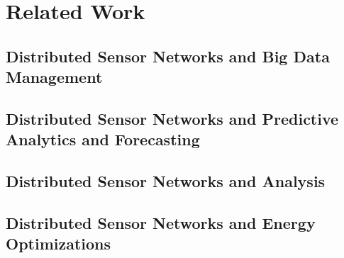 \chapter{Related Work}

\section{Distributed Sensor Networks and Big Data Management}

\section{Distributed Sensor Networks and Predictive Analytics and Forecasting}

\section{Distributed Sensor Networks and Analysis}

\section{Distributed Sensor Networks and Energy Optimizations}



